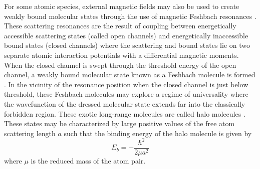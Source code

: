 For some atomic species, external magnetic fields may also be used to create weakly bound molecular states through the use of magnetic Feshbach resonances \cite{Kohler2006, Chin2010}.
These scattering resonances are the result of coupling between energetically accessible scattering states (called open channels) and energetically inaccessible bound states (closed channels) where the scattering and bound states lie on two separate atomic interaction potentials with a differential magnetic moments.
When the closed channel is swept through the threshold energy of the open channel, a weakly bound molecular state known as a Feshbach molecule is formed \cite{cbk03, grj03,hkm03,rtb03,sph03}.
In the vicinity of the resonance position when the closed channel is just below threshold, these Feshbach molecules may explore a regime of universality where the wavefunction of the dressed molecular state extends far into the classically forbidden region.
These exotic long-range molecules are called halo molecules \cite{Kohler2006}.
These states may be characterized by large positive values of the free atom scattering length $a$ such that the binding energy of the halo molecule is given by
\begin{equation}
	E_b = -\frac{\hbar^2}{2 \mu a^2}
\end{equation}
where $\mu$ is the reduced mass of the atom pair.

